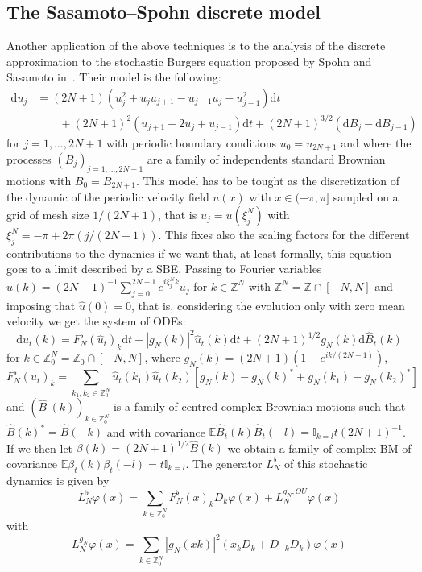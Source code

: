 \documentclass[11pt,a4paper,draft,reqno]{amsart}
\newcommand{\II}{\mathbb{I}}
\newcommand{\ZZ}{\mathbb{Z}}
\newcommand{\expect}{\mathbb{E}}
\newcommand{\dd}{\mathrm{d}}
\begin{document}
\subsection{The Sasamoto--Spohn discrete model}
Another application of the above techniques is to the analysis of the discrete approximation to the stochastic Burgers equation proposed by Spohn and Sasamoto in~\cite{Spohn}. Their model is the following:
\begin{equation}
\label{eq:sasamoto-spohn}
\begin{split}
\dd u_j & = (2N+1) (u_j^2+u_j u_{j+1}-u_{j-1}u_j-u^2_{j-1})\dd t
\\
 & \qquad  + (2N+1)^2(u_{j+1}-2 u_j+u_{j-1})\dd t + (2N+1)^{3/2} (\dd B_j - \dd B_{j-1})
\end{split}
\end{equation}
for $j=1,\dots,2N+1$ with periodic boundary conditions $u_0=u_{2N+1}$ and where the processes $(B_j)_{j=1,\dots,2N+1}$ are a family of independents standard Brownian motions with $B_0=B_{2N+1}$. This model has to be tought as the discretization of the dynamic of the periodic velocity field $u(x)$ with $x\in(-\pi,\pi]$ sampled on a grid of mesh size $1/(2N+1)$,  that is $u_j = u(\xi^N_j)$ with $\xi^N_j = -\pi+2\pi(j/(2N+1))$. This fixes also the scaling factors for the different contributions to the dynamics if we want that, at least formally, this equation goes to a limit described by a SBE. Passing to Fourier variables $\hat u(k) = (2N+1)^{-1}\sum_{j=0}^{2N-1} e^{i \xi^N_j k} u_j$ for $k\in \ZZ^N$ with $\ZZ^N = \ZZ\cap [-N,N]$ and imposing that $\hat u(0)=0$, that is, considering the evolution only with zero mean velocity we get the system of ODEs:
$$
\dd \hat u_t(k) = F^\flat_N(\hat u_t)_k \dd t 
 -  |g_N(k)|^2  \hat u_t(k) \dd t + (2N+1)^{1/2} g_N(k) \dd \hat B_t(k)
$$
for $k\in \ZZ_0^N=\ZZ_0\cap [-N,N]$, where $g_N(k)=(2N+1)(1-e^{i k/(2N+1)})$,
$$
F^\flat_N(u_t)_k = \sum_{k_1,k_2\in\ZZ^N_0} \hat u_t(k_1)\hat u_t(k_2)[ g_N(k)-g_N(k)^*+g_N(k_1)-g_N(k_2)^*]
$$
and $(\hat B_\cdot(k))_{k\in\ZZ_0^N}$ is a family of centred complex Brownian motions such that $\hat B(k)^* = \hat B(-k)$ and with covariance $\expect \hat B_t(k) \hat B_t(-l) = \II_{k=l} t (2N+1)^{-1}$. 
If we then let $\beta(k) = (2N+1)^{1/2} \hat B(k)$ we obtain a family of complex BM of covariance 
$\expect  \beta_t(k)  \beta_t(-l) = t \II_{k=l} $. The generator $L^\flat_N$ of this stochastic dynamics is given by
$$
L^{\flat}_N \varphi( x) = \sum_{k\in\ZZ^N_0} F^\flat_N(x)_k  D_k \varphi( x)+L^{g_N,OU}_N \varphi (x)
$$
with $$ 
L^{g_N}_N \varphi( x) = \sum_{k\in\ZZ^N_0} |g_N(xk)|^2 (x_k D_{k}+ D_{-k}  D_k) \varphi( x)
$$
\end{document}
